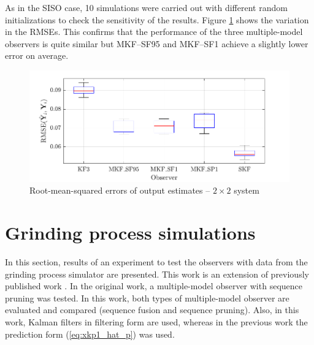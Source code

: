 As in the SISO case, 10 simulations were carried out with different random initializations to check the sensitivity of the results. Figure \ref{fig:rod-obs-sim2-yest-all-seed-RMSE-box} shows the variation in the RMSEs. This confirms that the performance of the three multiple-model observers is quite similar but MKF--SF95 and MKF--SF1 achieve a slightly lower error on average.
\begin{figure}[htp]
	\centering
	\includegraphics[width=12cm]{images/rod_obs_sim3_all_seed_y_err_box.pdf}
	\caption{Root-mean-squared errors of output estimates – $2\times2$ system}
	\label{fig:rod-obs-sim2-yest-all-seed-RMSE-box}
\end{figure}

\section{Grinding process simulations} \label{sec:sim-ore-SISO}

In this section, results of an experiment to test the observers with data from the grinding process simulator are presented. This work is an extension of previously published work \citep{tubbs_observer_2022}. In the original work, a multiple-model observer with sequence pruning was tested. In this work, both types of multiple-model observer are evaluated and compared (sequence fusion and sequence pruning). Also, in this work, Kalman filters in filtering form are used, whereas in the previous work the prediction form (\ref{eq:xkp1_hat_p}) was used.

